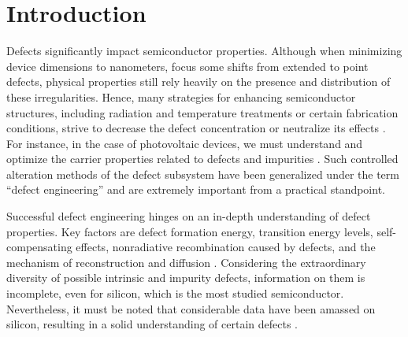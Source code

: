\documentclass{WileyMSP-template}
\begin{document}


\section{Introduction}

Defects significantly impact semiconductor properties.
Although when minimizing device dimensions to nanometers, focus some shifts from extended to point defects,
physical properties still rely heavily on the presence and distribution of these irregularities.
Hence, many strategies for enhancing semiconductor structures, including radiation and temperature treatments or certain fabrication conditions, strive to decrease the defect concentration or neutralize its effects \cite{Cai2023,Vobecky2021,Frascaroli2021}.
For instance, in the case of photovoltaic devices, we must understand and optimize the carrier properties related to defects and impurities  \cite{Cai2023}.
Such controlled alteration methods of the defect subsystem have been generalized under the term ``defect engineering'' and are extremely important from a practical standpoint.

Successful defect engineering hinges on an in-depth understanding of defect properties.
Key factors are defect formation energy, transition energy levels, self-compensating effects, nonradiative recombination caused by defects,
and the mechanism of reconstruction and diffusion  \cite{Cai2023}.
Considering the extraordinary diversity of possible intrinsic and impurity defects, information on them is incomplete,
even for silicon, which is the most studied semiconductor.
Nevertheless, it must be noted that considerable data have been amassed on silicon, resulting in a solid understanding of certain defects \cite{Juhl2018}.
\end{document}

